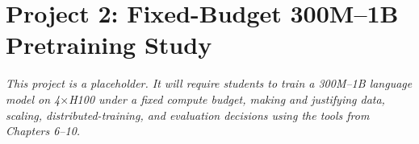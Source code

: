 \chapter*{Project 2: Fixed-Budget 300M--1B Pretraining Study}
\label{project:pretraining}

%
%
%
%
%
%

\textit{This project is a placeholder. It will require students to train a
300M--1B language model on 4$\times$H100 under a fixed compute budget,
making and justifying data, scaling, distributed-training, and evaluation
decisions using the tools from Chapters 6--10.}
